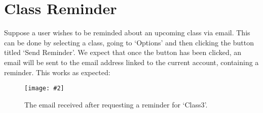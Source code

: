 \documentclass{article}
\newcommand{\screen}[3]{
    \begin{figure}[h]
    \centering
    \texttt{[image: \#2]}
    \caption{#3}
    \end{figure}
}
\begin{document}
\section{Class Reminder}
Suppose a user wishes to be reminded about an upcoming class via email.
This can be done by selecting a class, going to `Options' and then clicking the button titled `Send Reminder'.
We expect that once the button has been clicked, an email will be sent to the email address linked to the current account, containing a reminder.
This works as expected:
\screen{1}{email}{The email received after requesting a reminder for `Class3'.}
\end{document}
